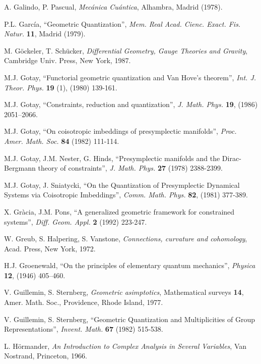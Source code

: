 \documentclass[12pt]{article}
\theoremstyle{plain}
\begin{document}
\begin{thebibliography}{55}
{\sc A. Galindo, P. Pascual},
{\it Mec\'anica Cu\'antica\/},
Alhambra, Madrid (1978).

{\sc P.L. Garc\'ia},
``Geometric Quantization'',
{\it Mem. Real Acad. Cienc. Exact. Fis. Natur.} {\bf 11}, Madrid (1979).

{\sc M. G\"ockeler, T. Sch\"ucker},
{\it Differential Geometry, Gauge Theories and Gravity},
Cambridge Univ. Press, New York, 1987.

{\sc M.J. Gotay},
``Functorial geometric quantization and Van Hove's theorem'',
{\it Int. J. Theor. Phys.}
{\bf 19} (1),  (1980) 139-161.

{\sc M.J. Gotay},
``Constraints, reduction and quantization'',
{\it J. Math. Phys.} {\bf 19},  (1986) 2051--2066.

{\sc M.J. Gotay},
``On coisotropic imbeddings of presymplectic manifolds'',
{\it  Proc. Amer. Math. Soc.} {\bf 84} (1982) 111-114.

{\sc M.J. Gotay, J.M. Nester, G. Hinds},
``Presymplectic manifolds and the Dirac-Bergmann theory of
constraints'',
{\it J. Math. Phys.} {\bf 27} (1978) 2388-2399.

{\sc M.J. Gotay, J. Sniatycki},
``On the Quantization of Presymplectic Dynamical Systems
  via Coisotropic Imbeddings'',
{\it Comm. Math. Phys.} {\bf 82}, (1981) 377-389.

{\sc X. Gr\`acia, J.M. Pons},
``A generalized geometric framework for constrained systems'',
{\it Diff. Geom. Appl.} {\bf 2} (1992) 223-247.

{\sc W. Greub, S. Halpering, S. Vanstone},
{\it Connections, curvature and cohomology},
Acad. Press, New York, 1972.

{\sc H.J. Groenewald},
``On the principles of elementary quantum mechanics'',
{\it Physica}
{\bf 12}, (1946) 405--460.

{\sc V. Guillemin, S. Sternberg},
{\it Geometric asimptotics},
Mathematical surveys {\bf 14},
Amer. Math. Soc., Providence, Rhode Island, 1977.

{\sc V. Guillemin, S. Sternberg},
``Geometric Quantization and Multiplicities of Group Representations'',
{\it Invent. Math.} {\bf 67} (1982) 515-538.

{\sc L. H\"ormander},
{\it An Introduction to Complex Analysis in Several Variables},
Van Nostrand, Princeton, 1966.


\end{thebibliography}
\end{document}
